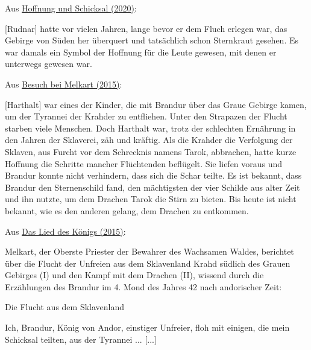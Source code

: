 \documentclass[10pt, a4paper, oneside]{book}
\newcommand{\refprodukt}[1]{\hyperref[Produkt: #1]{#1}}
\newcommand{\refstorytext}[1]{\hyperref[Storytext: #1]{#1}}
\begin{document}
\begin{multicols}{2}
\begin{center}
    Aus \refstorytext{Hoffnung und Schicksal (2020)}:
\end{center}

[Rudnar] hatte vor vielen Jahren, lange bevor er dem Fluch erlegen war, das Gebirge von Süden her überquert und tatsächlich schon Sternkraut gesehen. Es war damals ein Symbol der Hoffnung für die Leute gewesen, mit denen er unterwegs gewesen war.


\begin{center}
    Aus \refstorytext{Besuch bei Melkart (2015)}:
\end{center}

[Harthalt] war eines der Kinder, die mit Brandur über das Graue Gebirge kamen, um der Tyrannei der Krahder zu entfliehen. Unter den Strapazen der Flucht starben viele Menschen. Doch Harthalt war, trotz der schlechten Ernährung in den Jahren der Sklaverei, zäh und kräftig. Als die Krahder die Verfolgung der Sklaven, aus Furcht vor dem Schrecknis namens Tarok, abbrachen, hatte kurze Hoffnung die Schritte mancher Flüchtenden beflügelt. Sie liefen voraus und Brandur konnte nicht verhindern, dass sich die Schar teilte. Es ist bekannt, dass Brandur den Sternenschild fand, den mächtigsten der vier Schilde aus alter Zeit und ihn nutzte, um dem Drachen Tarok die Stirn zu bieten. Bis heute ist nicht bekannt, wie es den anderen gelang, dem Drachen zu entkommen.



\begin{center}
    Aus \refprodukt{Das Lied des Königs (2015)}:
\end{center}

Melkart, der Oberste Priester der Bewahrer des Wachsamen Waldes, berichtet über die Flucht der Unfreien aus dem Sklavenland Krahd südlich des Grauen Gebirges (I) und den Kampf mit dem Drachen (II), wissend durch die Erzählungen des Brandur im 4. Mond des Jahres 42 nach andorischer Zeit:

Die Flucht aus dem Sklavenland
    
Ich, Brandur, König von Andor, einstiger Unfreier, floh mit einigen, die mein Schicksal teilten, aus der Tyrannei ... [...]\newpage %


\end{multicols}
\end{document}
